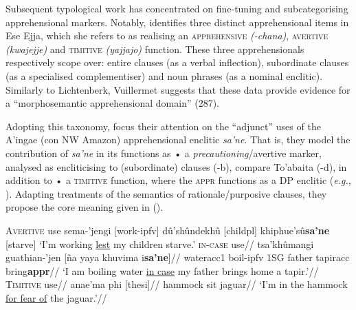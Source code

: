 Subsequent typological work has concentrated on fine-tuning and subcategorising apprehensional markers. Notably, \citet{Vuillermet2018} identifies three distinct apprehensional items in Ese Ejja, which she refers to as realising an \textsc{apprehensive} \textit{(-chana)}, \textsc{avertive} \textit{(kwajejje)} and \textsc{timitive} \textit{(\textdblhyphen yajjajo)} function. These three apprehensionals respectively scope over: entire clauses (as a verbal inflection), subordinate clauses (as a specialised complementiser) and noun phrases (as a nominal enclitic). Similarly to Lichtenberk, Vuillermet suggests that these data provide evidence for a ``morphosemantic apprehensional domain'' (287).

Adopting this taxonomy, \cite{AnderBois2020} focus their attention on the ``adjunct'' uses of the A'ingae (\gls{con} NW Amazon) apprehensional enclitic \textit{\textdblhyphen sa'ne}. That is, they model the contribution of \textit{\textdblhyphen sa'ne} in its functions as • a \textit{precautioning}/avertive marker, analysed as encliticising to (subordinate) clauses (-b), compare To'abaita (-d), in addition to • a \textsc{timitive} function, where the \textsc{appr} functions as a DP enclitic (\textit{e.g.}, ). Adapting treatments of the semantics of rationale/purposive clauses, they propose the core meaning given in ().


\pex {}
\a\begingl[glstyle=nlevel] 
\glpreamble \textsc{Avertive} use\endpreamble
sema-’je\textdblhyphen{}ngi [work-\gls{ipfv}]
dû’shû\textdblhyphen{}ndekhû [child\textdblhyphen \gls{pl}]
khiphue’sû\textbf{\textdblhyphen{}sa’ne }[starve]
\glft‘I'm working \ul{lest} my children starve.'
\endgl
\a\begingl\glpreamble \textsc{in-case} use//
\gla tsa’khû\textdblhyphen{}ma\textdblhyphen{}ngi guathian-’jen [ña yaya khuvi\textdblhyphen{}ma i\textbf{\textdblhyphen{}sa’ne}]//
\glb water\textdblhyphen{}\gls{acc}\textdblhyphen{}1 boil-\gls{ipfv} 1SG father tapir\textdblhyphen\gls{acc} bring\textdblhyphen\textbf{\gls{appr}}//
\glft‘I am boiling water \ul{in case} my father brings home a tapir.’//\endgl
\a\begingl\glpreamble \textsc{Timitive} use//
\gla anae'ma phi [thesi\textbf{}]//
\glb hammock sit jaguar//
\glft`I'm in the hammock \ul{for fear of} the jaguar.'//
\endgl
\xe

